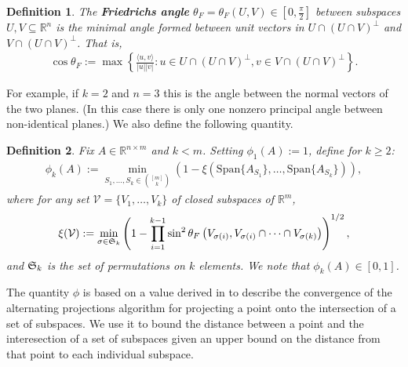 \documentclass[journal, onecolumn]{IEEEtran}
\newtheorem{definition}{Definition}
\begin{document}
\begin{definition}\label{FriedrichsDefinition}
The \textbf{Friedrichs angle} $\theta_F = \theta_F(U,V) \in [0,\frac{\pi}{2}]$ between subspaces $U,V \subseteq \mathbb{R}^n$ is the minimal angle formed between unit vectors in $U \cap (U \cap V)^\perp$ and $V \cap (U \cap V)^\perp$. That is,
\begin{align}
\cos{\theta_F} := \max\left\{ \frac{ \langle u, v \rangle }{|u||v|}: u \in U \cap (U \cap V)^\perp, v \in V \cap (U \cap V)^\perp \right\}.
\end{align}
\end{definition}

For example, if $k=2$ and $n=3$ this is the angle between the normal vectors of the two planes. (In this case there is only one nonzero principal angle between non-identical planes.) We also define the following quantity.

\begin{definition}\label{SpecialSupportSet}
Fix $A \in \mathbb{R}^{n \times m}$ and $k < m$. Setting $\phi_1(A) := 1$, define for $k \geq 2$:
\begin{align}\label{rho}
\phi_k(A) := \min_{ S_1,\ldots,S_k \in {[m] \choose k} } \left(1 - \xi( \text{Span}\{A_{S_1}\}, \ldots,  \text{Span}\{A_{S_k}\}) \right),
\end{align}
where for any set $\mathcal{V} = \{V_1, \ldots, V_k\}$ of closed subspaces of $\mathbb{R}^m$, 
\begin{align}
\xi(\mathcal{V}) := \min_{\sigma \in \frak{S}_k} \left(1 - \prod_{i=1}^{k-1} \sin^2  \theta_F \left(V_{\sigma(i)}, V_{\sigma(i)} \cap \cdots \cap V_{\sigma(k)}\right)  \right)^{1/2},
\end{align}
%
and $\frak{S}_k$ is the set of permutations on $k$ elements. We note that $\phi_k(A) \in [0,1]$.
\end{definition}

The quantity $\phi$ is based on a value derived in \cite{Deutsch} to describe the convergence of the alternating projections algorithm for projecting a point onto the intersection of a set of subspaces. We use it to bound the distance between a point and the interesection of a set of subspaces given an upper bound on the distance from that point to each individual subspace. 

\end{document}
